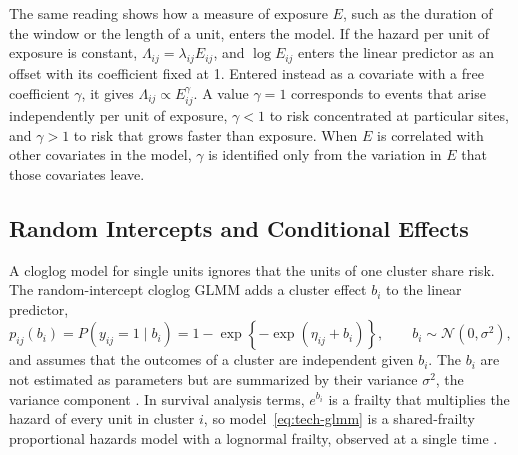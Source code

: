 The same reading shows how a measure of exposure $E$, such as the duration of the window or the length of a unit, enters the model.
If the hazard per unit of exposure is constant, $\Lambda_{ij} = \lambda_{ij} E_{ij}$, and $\log E_{ij}$ enters the linear predictor as an offset with its coefficient fixed at 1.
Entered instead as a covariate with a free coefficient $\gamma$, it gives $\Lambda_{ij} \propto E_{ij}^{\gamma}$.
A value $\gamma = 1$ corresponds to events that arise independently per unit of exposure, $\gamma < 1$ to risk concentrated at particular sites, and $\gamma > 1$ to risk that grows faster than exposure.
When $E$ is correlated with other covariates in the model, $\gamma$ is identified only from the variation in $E$ that those covariates leave.

\subsection{Random Intercepts and Conditional Effects}
\label{sec:tech-glmm}

A cloglog model for single units ignores that the units of one cluster share risk.
The random-intercept cloglog GLMM adds a cluster effect $b_i$ to the linear predictor,
\begin{equation}
  p_{ij}(b_i) = P(y_{ij} = 1 \mid b_i) = 1 - \exp\!\left\{-\exp(\eta_{ij} + b_i)\right\},
  \qquad
  b_i \sim \mathcal{N}(0, \sigma^2),
  \label{eq:tech-glmm}
\end{equation}
and assumes that the outcomes of a cluster are independent given $b_i$.
The $b_i$ are not estimated as parameters but are summarized by their variance $\sigma^2$, the variance component \cite{statacorp2025mecloglog}.
In survival analysis terms, $e^{b_i}$ is a frailty that multiplies the hazard of every unit in cluster $i$, so model~\eqref{eq:tech-glmm} is a shared-frailty proportional hazards model with a lognormal frailty, observed at a single time \cite{duchateau2008frailty}. %

